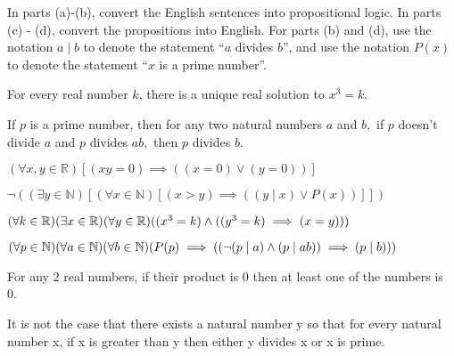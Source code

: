 \documentclass[11pt]{article}
\begin{document}
In parts (a)-(b), convert the English sentences into propositional logic. In parts (c) - (d), convert the propositions into English. For parts (b) and (d), use the notation $a \mid b$ to denote the statement ``$a$ divides $b$'', and use the notation $P(x)$ to denote the statement ``$x$ is a prime number''.
\begin{Parts}

\Part For every real number $k$, there is a unique real solution to $x^3 = k.$

\Part If $p$ is a prime number, then for any two natural numbers $a$ and $b,$ if $p$ doesn't divide $a$ and $p$ divides $ab,$ then $p$ divides $b.$

\Part $(\forall x, y \in \mathbb{R}) \left[(xy = 0) \implies ((x = 0) \lor (y = 0)) \right]$

\Part $\neg((\exists y \in \mathbb{N}) \left[(\forall x \in \mathbb{N}) \left[(x > y) \implies ((y \mid x) \lor P(x))\right] \right])$

\end{Parts}

\begin{solution}
\begin{Parts}

\Part $(\forall k\in\mathbb{R} )(\exists x\in\mathbb{R})(\forall y\in\mathbb{R})((x^3=k)\land((y^3=k)\implies(x=y)))$

\Part $(\forall p\in\mathbb{N})(\forall a\in\mathbb{N})(\forall b\in\mathbb{N})(P(p)\implies((\lnot(p\mid a)\land(p\mid ab))\implies(p\mid b)))$

\Part For any 2 real numbers, if their product is 0 then at least one of the numbers is 0.

\Part It is not the case that there exists a natural number y so that 
for every natural number x, if x is greater than y then either y divides x or x is prime. 

\end{Parts}
\end{solution}
\end{document}
